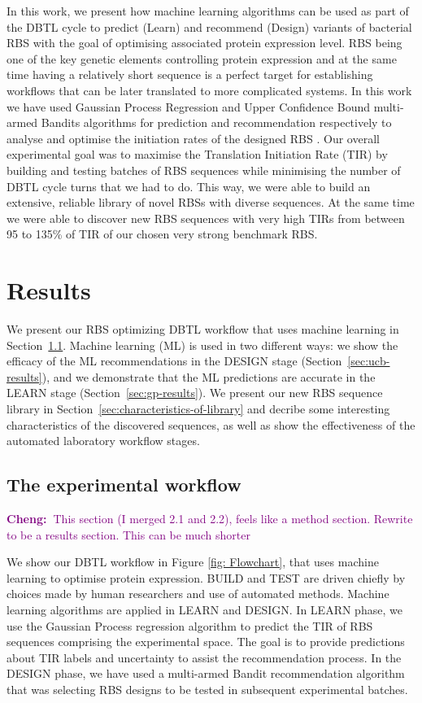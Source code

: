 \documentclass{article}
\newcommand{\cheng}[1]{\textcolor{purple}{{\bf Cheng:~}#1}}
\begin{document}
In this work, we present how machine learning algorithms can be used as part of the DBTL cycle to predict (Learn) and recommend (Design) variants of bacterial RBS with the goal of optimising associated protein expression level. 
RBS being one of the key genetic elements controlling protein expression and at the same time having a relatively short sequence is a perfect target for establishing workflows that can be later translated to more complicated systems.
In this work we have used Gaussian Process Regression \cite{Rasmussen2004} and Upper Confidence Bound multi-armed Bandits algorithms \cite{desautels2014parallelizing} for prediction and recommendation respectively to analyse and optimise the initiation rates of the designed RBS .
Our overall experimental goal was to maximise the Translation Initiation Rate (TIR) by building and testing batches of RBS sequences while minimising the number of DBTL cycle turns that we had to do.
This way, we were able to build an extensive, reliable library of novel RBSs with diverse sequences.
At the same time we were able to discover new RBS sequences with very high TIRs from between 95 to 135\% of TIR of our chosen very strong benchmark RBS. 

\section{Results}

We present our RBS optimizing DBTL workflow that uses machine learning in Section~\ref{sec:dbtl-workflow}.
Machine learning (ML) is used in two different ways: we show the efficacy of the ML recommendations
in the DESIGN stage (Section~\ref{sec:ucb-results}),
and we demonstrate that the ML predictions are accurate in the LEARN stage (Section~\ref{sec:gp-results}).
We present our new RBS sequence library in Section~\ref{sec:characteristics-of-library} and decribe some interesting
characteristics of the discovered sequences, 
as well as show the effectiveness of the automated laboratory workflow stages.

\subsection{The experimental workflow}
\label{sec:dbtl-workflow}

\cheng{This section (I merged 2.1 and 2.2), feels like a method section. Rewrite to be a results section. 
This can be much shorter}

We show our DBTL workflow in Figure \ref{fig: Flowchart}, that uses machine learning to optimise protein expression.
BUILD and TEST are driven chiefly by choices made by human researchers and use of automated methods.
Machine learning algorithms are applied in LEARN and DESIGN.
In LEARN phase, we use the Gaussian Process regression algorithm to predict the TIR of RBS sequences comprising the experimental space.
The goal is to provide predictions about TIR labels and uncertainty to assist the recommendation process.
In the DESIGN phase, we have used a multi-armed Bandit recommendation algorithm that was selecting RBS designs to be tested in subsequent experimental batches.\\
\end{document}

